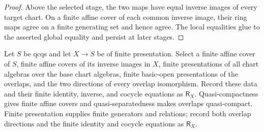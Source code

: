 \begin{proof}
  Above the selected stage, the two maps have equal inverse images of every
  target chart.  On a finite affine cover of each common inverse image, their
  ring maps agree on a finite generating set and hence agree.  The local
  equalities glue to the asserted global equality and persist at later stages.
\end{proof}

\begin{definition}
  \label{def:nagata-relative-finite-affine-presentation}

  Let $S$ be qcqs and let $X\to S$ be of finite presentation.  Select a
  finite affine cover of
  $S$, finite affine covers of its inverse images in $X$, finite
  presentations of all chart algebras over the base chart algebras, finite
  basic-open presentations of the overlaps, and the two directions of every
  overlap isomorphism.  Record these data and their finite identity, inverse,
  and cocycle equations as $\mathsf R_X$.
  Quasi-compactness gives finite affine covers and quasi-separatedness makes
  overlaps quasi-compact. Finite presentation supplies finite generators and
  relations; record both overlap directions and the finite identity and
  cocycle equations as $\mathsf R_X$.
\end{definition}

